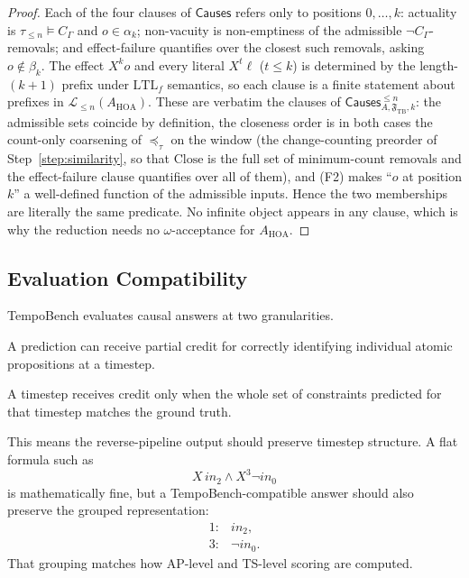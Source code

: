 \documentclass[11pt]{article}
\theoremstyle{remark}
\newcommand{\LTL}{\mathrm{LTL}}
\newcommand{\Close}{\mathrm{Close}}
\newcommand{\Lang}{\mathcal{L}}
\newcommand{\Frame}{\mathfrak{F}}
\begin{document}
\begin{proof}
Each of the four clauses of \(\mathsf{Causes}\) refers only to positions
\(0,\ldots,k\): actuality is \(\tau_{\le n}\models C_\Gamma\) and \(o\in\alpha_k\);
non-vacuity is non-emptiness of the admissible \(\neg C_\Gamma\)-removals; and
effect-failure quantifies over the closest such removals, asking \(o\notin\beta_k\).
The effect \(X^k o\) and every literal \(X^t\ell\) (\(t\le k\)) is determined by
the length-\((k{+}1)\) prefix under \(\LTL_f\) semantics, so each clause is a
finite statement about prefixes in \(\Lang_{\le n}(A_{\mathrm{HOA}})\). These are
verbatim the clauses of \(\mathsf{Causes}^{\le n}_{A,\Frame_{\mathrm{TB}},k}\):
the admissible sets coincide by definition, the closeness order is in both cases
the count-only coarsening of \(\preceq_\tau\) on the window (the change-counting
preorder of Step~\ref{step:similarity}, so that \(\Close\) is the full set of
minimum-count removals and the effect-failure clause quantifies over all of them),
and (F2) makes ``\(o\) at position \(k\)'' a well-defined function of the
admissible inputs. Hence the two memberships are literally the same predicate. No
infinite object appears in any clause, which is why the reduction needs no
\(\omega\)-acceptance for \(A_{\mathrm{HOA}}\).
\end{proof}

\subsection{Evaluation Compatibility}

TempoBench evaluates causal answers at two granularities.
\begin{description}[leftmargin=2.8cm,style=nextline]
  \item[AP-level]
  A prediction can receive partial credit for correctly identifying individual
  atomic propositions at a timestep.

  \item[TS-level]
  A timestep receives credit only when the whole set of constraints predicted
  for that timestep matches the ground truth.
\end{description}

This means the reverse-pipeline output should preserve timestep structure. A
flat formula such as
\[
  X\,in_2\land X^3\neg in_0
\]
is mathematically fine, but a TempoBench-compatible answer should also preserve
the grouped representation:
\[
\begin{array}{ll}
  1: & in_2,\\
  3: & \neg in_0.
\end{array}
\]
That grouping matches how AP-level and TS-level scoring are computed.
\end{document}
